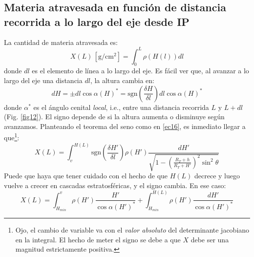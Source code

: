 \documentclass[a4paper,12pt]{article}
\numberwithin{equation}{section}
\numberwithin{figure}{section}
\begin{document}
\subsection{Materia atravesada en función de distancia recorrida a lo largo del eje desde IP}
La cantidad de materia atravesada es:
\begin{equation}
	X(L)\,\left[\mathrm{g/cm^2}\right]=\int_{0}^L\rho(H(l))dl\label{ec18}
\end{equation}
donde $dl$ es el elemento de línea a lo largo del eje. Es fácil ver que, al avanzar a lo largo del eje una distancia $dl$, la altura cambia en:
\begin{equation}
	dH = \pm dl \cos{\alpha(H)^*} = \mathrm{sgn}\left(\frac{\delta H}{\delta l}\right) dl \cos{\alpha(H)^*}\label{ec19}
\end{equation}
donde $\alpha^*$ es el ángulo cenital \textit{local}, i.e., entre una distancia recorrida $L$ y $L+dl$ (Fig. \ref{fig12}). El signo depende de si la altura aumenta o disminuye según avanzamos. Planteando el teorema del seno como en \eqref{ec16}, es inmediato llegar a que\footnote{ Ojo, el cambio de variable va con el \textit{valor absoluto} del determinante jacobiano en la integral. El hecho de meter el signo se debe a que $X$ debe ser una magnitud estrictamente positiva.}:
\begin{equation}
	X(L) = \int_{v}^{H(L)}\mathrm{sgn}\left(\frac{\delta H'}{\delta l}\right)\rho(H')\frac{dH'}{\sqrt{1-\left(\frac{R_T+h}{R_T+H'}\right)^2\sin^2\theta}}\label{ec110}
\end{equation}
Puede que haya que tener cuidado con el hecho de que $H(L)$ decrece y luego vuelve a crecer en cascadas estratosféricas, y el signo cambia. En ese caso:
\begin{equation}
	X(L) = \int_{H_{min}}^{v}\rho(H')\frac{H'}{\cos\alpha(H')^*}+\int_{H_{min}}^{H(L)}\rho(H')\frac{dH'}{\cos\alpha(H')^*}\label{ec111}
\end{equation}
\end{document}
